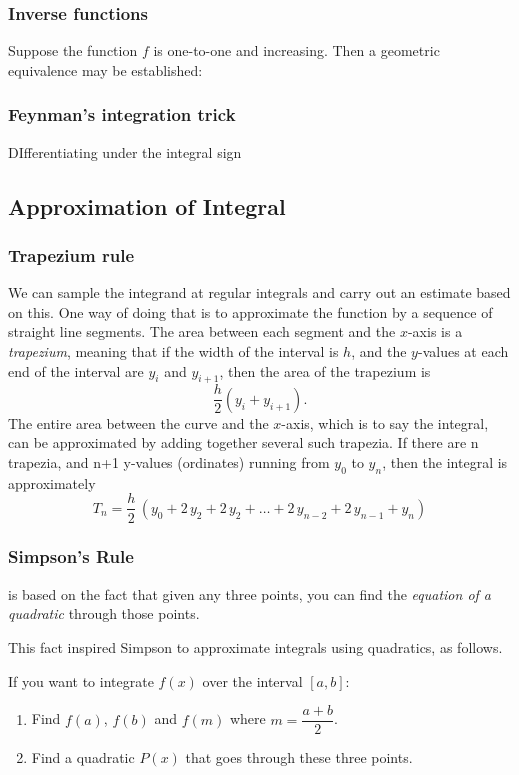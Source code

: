 \subsubsection{Inverse functions}
Suppose the function $f$ is one-to-one and increasing. Then a geometric equivalence may be established:


\subsubsection{Feynman's integration trick}
DIfferentiating under the integral sign

\subsection{Approximation of Integral}
\subsubsection{Trapezium rule}
We can sample the integrand at regular integrals and carry out an estimate based on this. One way of doing that is to approximate the function by a sequence of straight line segments. The area between each segment and the $x$-axis is a \emph{trapezium}, meaning that if the width of the interval is $h$, and the $y$-values at each end of the interval are $y_i$ and $y_{i+1}$, then the area of the trapezium is
\[ \frac{h}{2}(y_i+y_{i+1}). \]
The entire area between the curve and the $x$-axis, which is to say the integral, can be approximated by adding together several such trapezia. If there are n trapezia, and n+1 y-values (ordinates) running from $y_0$ to $y_n$, then the integral is approximately
\begin{equation}
T_n=\frac{h}{2}\,(y_0+2\,y_2+2\,y_2+\dots+2\,y_{n-2}+2\,y_{n-1}+y_n)
\end{equation}

\subsubsection{Simpson's Rule}
 is based on the fact that given any three points, you can find the \emph{equation of a quadratic} through those points. 

This fact inspired Simpson to approximate integrals using quadratics, as follows.

If you want to integrate $f(x)$ over the interval $[a,b]$:
\begin{enumerate}
\item Find $f(a)$, $f(b)$ and $f(m)$ where $m=\dfrac{a+b}{2}$.
\item Find a quadratic $P(x)$ that goes through these three points.
\end{enumerate}


